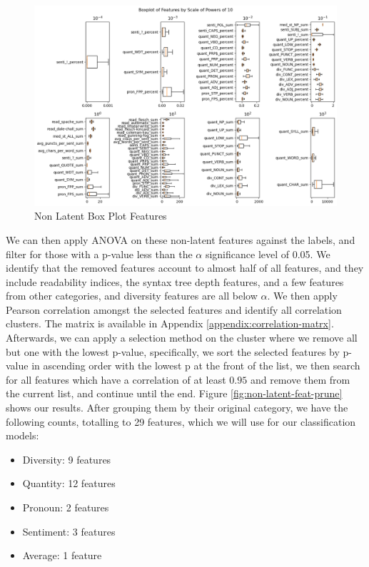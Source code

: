 \documentclass{article}
\begin{document}
\begin{figure}[H]
  \centering
  \includegraphics[width=\textwidth]{img/non_latent_box_plot.png}
  \caption{Non Latent Box Plot Features}
  \label{box-plot}
\end{figure}

We can then apply ANOVA on these non-latent features against the labels, and filter for those with a p-value less than the $\alpha$ significance level of 0.05. We identify that the removed features account to almost half of all features, and they include readability indices, the syntax tree depth features, and a few features from other categories, and diversity features are all below $\alpha$. We then apply Pearson correlation amongst the selected features and identify all correlation clusters. The matrix is available in Appendix \ref{appendix:correlation-matrx}. Afterwards, we can apply a selection method on the cluster where we remove all but one with the lowest p-value, specifically, we sort the selected features by p-value in ascending order with the lowest p at the front of the list, we then search for all features which have a correlation of at least $0.95$ and remove them from the current list, and continue until the end. Figure \ref{fig:non-latent-feat-prune} shows our results. After grouping them by their original category, we have the following counts, totalling to 29 features, which we will use for our classification models:
\begin{itemize}
    \item Diversity: 9 features
    \item Quantity: 12 features
    \item Pronoun: 2 features
    \item Sentiment: 3 features
    \item Average: 1 feature    
\end{itemize}
\end{document}
